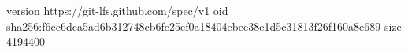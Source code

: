 version https://git-lfs.github.com/spec/v1
oid sha256:f6cc6dca5ad6b312748cb6fe25ef0a18404ebee38e1d5c31813f26f160a8e689
size 4194400
